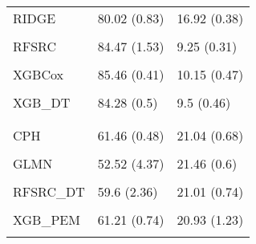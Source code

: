 \begin{longtable}[t]{lll}
\hspace{1em}RIDGE & 80.02 (0.83) & 16.92 (0.38)\\
\hspace{1em}\cellcolor{gray!10}{GLMN} & \cellcolor{gray!10}{80.7 (0.79)} & \cellcolor{gray!10}{14.39 (0.85)}\\
\hspace{1em}RFSRC & 84.47 (1.53) & 9.25 (0.31)\\
\hspace{1em}\cellcolor{gray!10}{RFSRC\_DT} & \cellcolor{gray!10}{85.25 (0.67)} & \cellcolor{gray!10}{11.82 (1.17)}\\
\hspace{1em}XGBCox & 85.46 (0.41) & 10.15 (0.47)\\
\hspace{1em}\cellcolor{gray!10}{XGB\_PEM} & \cellcolor{gray!10}{84.79 (0.77)} & \cellcolor{gray!10}{9.55 (0.41)}\\
\hspace{1em}XGB\_DT & 84.28 (0.5) & 9.5 (0.46)\\
\addlinespace[0.3em]
\multicolumn{3}{l}{\textbf{cat\_adoption}}\\
\hspace{1em}\cellcolor{gray!10}{KM} & \cellcolor{gray!10}{50 (0)} & \cellcolor{gray!10}{21.46 (0.6)}\\
\hspace{1em}CPH & 61.46 (0.48) & 21.04 (0.68)\\
\hspace{1em}\cellcolor{gray!10}{RIDGE} & \cellcolor{gray!10}{59.98 (0.43)} & \cellcolor{gray!10}{21.46 (0.6)}\\
\hspace{1em}GLMN & 52.52 (4.37) & 21.46 (0.6)\\
\hspace{1em}\cellcolor{gray!10}{RFSRC} & \cellcolor{gray!10}{62.05 (0.48)} & \cellcolor{gray!10}{20.36 (0.79)}\\
\hspace{1em}RFSRC\_DT & 59.6 (2.36) & 21.01 (0.74)\\
\hspace{1em}\cellcolor{gray!10}{XGBCox} & \cellcolor{gray!10}{61.94 (1.02)} & \cellcolor{gray!10}{21.59 (1.15)}\\
\hspace{1em}XGB\_PEM & 61.21 (0.74) & 20.93 (1.23)\\
\hspace{1em}\cellcolor{gray!10}{XGB\_DT} & \cellcolor{gray!10}{60.89 (0.37)} & \cellcolor{gray!10}{21.02 (1.1)}\\

\end{longtable}
